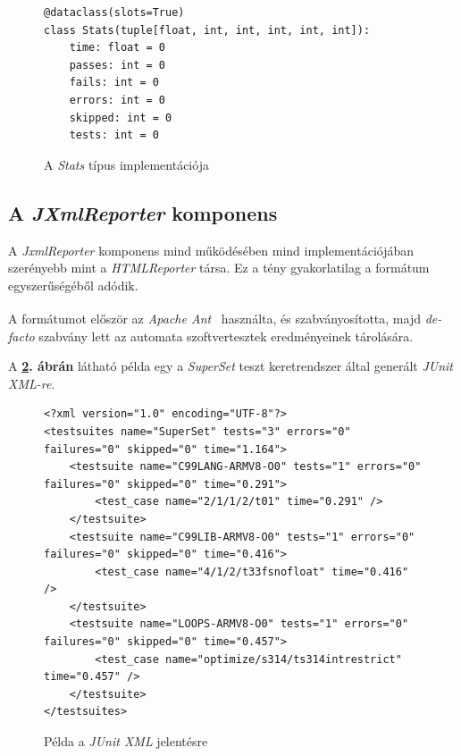     \begin{figure}[ht]
        \centering
        \begin{verbatim}
@dataclass(slots=True)
class Stats(tuple[float, int, int, int, int, int]):
    time: float = 0
    passes: int = 0
    fails: int = 0
    errors: int = 0
    skipped: int = 0
    tests: int = 0
    \end{verbatim}
        \caption{\label{fig:stats-implementation} A \textit{Stats} típus implementációja}
    \end{figure}

    \pagebreak
    \subsection{A \textit{JXmlReporter} komponens}

        A \textit{JxmlReporter} komponens mind működésében mind implementációjában szerényebb mint a
        \textit{HTMLReporter} társa. Ez a tény gyakorlatilag a formátum egyszerűségéből adódik.

        A formátumot először az \emph{Apache Ant\textsuperscript{\texttrademark}}~\cite{ant} használta, és
        szabványosította, majd \textit{de-facto} szabvány lett az automata szoftvertesztek eredményeinek tárolására.

        A \textbf{\ref{fig:jxml-report}. ábrán} látható példa egy a \textit{SuperSet} teszt keretrendszer által
        generált \textit{JUnit XML-re}.

        \begin{figure}[ht]
            \centering
            \begin{verbatim}
<?xml version="1.0" encoding="UTF-8"?>
<testsuites name="SuperSet" tests="3" errors="0" failures="0" skipped="0" time="1.164">
    <testsuite name="C99LANG-ARMV8-O0" tests="1" errors="0" failures="0" skipped="0" time="0.291">
        <test_case name="2/1/1/2/t01" time="0.291" />
    </testsuite>
    <testsuite name="C99LIB-ARMV8-O0" tests="1" errors="0" failures="0" skipped="0" time="0.416">
        <test_case name="4/1/2/t33fsnofloat" time="0.416" />
    </testsuite>
    <testsuite name="LOOPS-ARMV8-O0" tests="1" errors="0" failures="0" skipped="0" time="0.457">
        <test_case name="optimize/s314/ts314intrestrict" time="0.457" />
    </testsuite>
</testsuites>
        \end{verbatim}
            \caption{\label{fig:jxml-report} Példa a \textit{JUnit XML} jelentésre}
        \end{figure}

